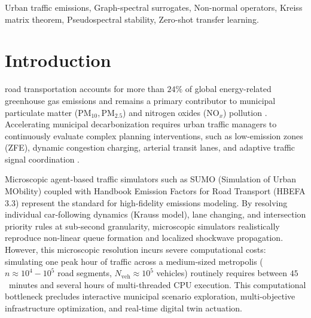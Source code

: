 \documentclass[journal]{IEEEtran}
\begin{document}
\begin{IEEEkeywords}
Urban traffic emissions, Graph-spectral surrogates, Non-normal operators, Kreiss matrix theorem, Pseudospectral stability, Zero-shot transfer learning.
\end{IEEEkeywords}

\section{Introduction}

 road transportation accounts for more than $24\%$ of global energy-related greenhouse gas emissions and remains a primary contributor to municipal particulate matter ($\text{PM}_{10}, \text{PM}_{2.5}$) and nitrogen oxides ($\text{NO}_x$) pollution \cite{IEA2023, UN2022}. Accelerating municipal decarbonization requires urban traffic managers to continuously evaluate complex planning interventions, such as low-emission zones (ZFE), dynamic congestion charging, arterial transit lanes, and adaptive traffic signal coordination \cite{Bell2000, Sheffi1985}. 

Microscopic agent-based traffic simulators such as SUMO (Simulation of Urban MObility) \cite{Krajzewicz2012} coupled with Handbook Emission Factors for Road Transport (HBEFA 3.3) \cite{Keller2017} represent the standard for high-fidelity emissions modeling. By resolving individual car-following dynamics (Krauss model), lane changing, and intersection priority rules at sub-second granularity, microscopic simulators realistically reproduce non-linear queue formation and localized shockwave propagation. However, this microscopic resolution incurs severe computational costs: simulating one peak hour of traffic across a medium-sized metropolis ($n \approx 10^4 - 10^5$ road segments, $N_{\text{veh}} \approx 10^5$ vehicles) routinely requires between $45$~minutes and several hours of multi-threaded CPU execution. This computational bottleneck precludes interactive municipal scenario exploration, multi-objective infrastructure optimization, and real-time digital twin actuation.
\end{document}
